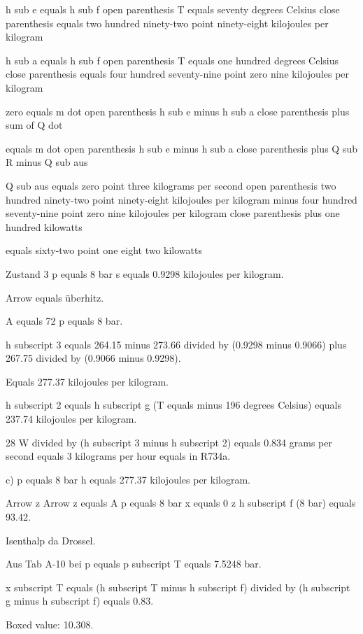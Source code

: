 h sub e equals h sub f open parenthesis T equals seventy degrees Celsius close parenthesis equals two hundred ninety-two point ninety-eight kilojoules per kilogram

h sub a equals h sub f open parenthesis T equals one hundred degrees Celsius close parenthesis equals four hundred seventy-nine point zero nine kilojoules per kilogram

zero equals m dot open parenthesis h sub e minus h sub a close parenthesis plus sum of Q dot

equals m dot open parenthesis h sub e minus h sub a close parenthesis plus Q sub R minus Q sub aus

Q sub aus equals zero point three kilograms per second open parenthesis two hundred ninety-two point ninety-eight kilojoules per kilogram minus four hundred seventy-nine point zero nine kilojoules per kilogram close parenthesis plus one hundred kilowatts

equals sixty-two point one eight two kilowatts

Zustand 3 p equals 8 bar s equals 0.9298 kilojoules per kilogram.

Arrow equals überhitz.

A equals 72 p equals 8 bar.

h subscript 3 equals 264.15 minus 273.66 divided by (0.9298 minus 0.9066) plus 267.75 divided by (0.9066 minus 0.9298).

Equals 277.37 kilojoules per kilogram.

h subscript 2 equals h subscript g (T equals minus 196 degrees Celsius) equals 237.74 kilojoules per kilogram.

28 W divided by (h subscript 3 minus h subscript 2) equals 0.834 grams per second equals 3 kilograms per hour equals in R734a.

c) p equals 8 bar h equals 277.37 kilojoules per kilogram.

Arrow z Arrow z equals A p equals 8 bar x equals 0 z h subscript f (8 bar) equals 93.42.

Isenthalp da Drossel.

Aus Tab A-10 bei p equals p subscript T equals 7.5248 bar.

x subscript T equals (h subscript T minus h subscript f) divided by (h subscript g minus h subscript f) equals 0.83.

Boxed value: 10.308.